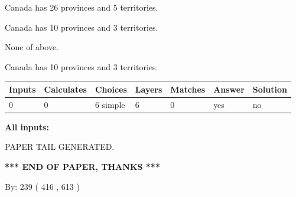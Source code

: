 \documentclass[12pt]{article}
\begin{document}
 
Canada has  26 provinces and  5 territories.
 
 
Canada has 10  provinces and 3 territories.
 
 
 None of above.
 
 
\noindent{}
 
 
Canada has 10  provinces and 3 territories.
 
 
\noindent{}
 
 
   
   
   
   
\noindent\begin{tabular}{|l|l|l|l|l|l|l|}
 \hline
Inputs & Calculates & Choices & Layers & Matches & Answer & Solution \\ \hline
 0  & 
 0  & 
 6
  simple  
  & 
 6  & 
 0  & 
  yes & 
  no 
  \\ \hline
 \end{tabular}
   
   
   
   
\noindent{}
   
   
   
   
\noindent\vspace{0.1in}\hspace{-0.08in} {\textbf{\Large{All inputs: }}}
   
   
   
   
   
   
 \vspace{0.2in}
 
   
   
\vspace{2.0in} PAPER TAIL GENERATED.
   
   
   
   
\vspace{1.0in} 
{\textbf{\large{ *** END OF PAPER, THANKS *** }}} 
   
   
\hspace{1.0in} By: 
 239 ( 416 ,  613 )
   
   
   
   
\newpage 
\setcounter{page}{ 
   542001 } 
   
   
   
\end{document}
